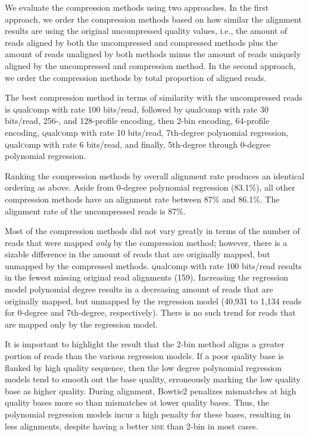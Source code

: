 \documentclass{bioinfo}
\begin{document}
We evaluate the compression methods using two approaches. In the first
approach, we order the compression methods based on how similar the
alignment results are using the original uncompressed quality values,
i.e., the amount of reads aligned by both the uncompressed and
compressed methods plus the amount of reads unaligned by both methods
minus the amount of reads uniquely aligned by the uncompressed and
compression method. In the second approach, we order the compression
methods by total proportion of aligned reads.

The best compression method in terms of similarity with the
uncompressed reads is \textsc{q}ual\textsc{c}omp with rate 100
bits/read, followed by \textsc{q}ual\textsc{c}omp with rate 30
bits/read, 256-, and 128-profile encoding, then 2-bin encoding,
64-profile encoding, \textsc{q}ual\textsc{c}omp with rate 10
bits/read, 7th-degree polynomial regression,
\textsc{q}ual\textsc{c}omp with rate 6 bits/read, and finally,
5th-degree through 0-degree polynomial regression.

Ranking the compression methods by overall alignment rate produces an
identical ordering as above. Aside from 0-degree polynomial regression
(83.1\%), all other compression methods have an alignment rate between
87\% and 86.1\%. The alignment rate of the uncompressed reads is 87\%.

Most of the compression methods did not vary greatly in terms of the
number of reads that were mapped \emph{only} by the compression
method; however, there is a sizable difference in the amount of reads
that are originally mapped, but unmapped by the compressed methods.
\textsc{q}ual\textsc{c}omp with rate 100 bits/read results in the
fewest missing original read alignments (159). Increasing the
regression model polynomial degree results in a decreasing amount of
reads that are originally mapped, but unmapped by the regression model
(40,931 to 1,134 reads for 0-degree and 7th-degree,
respectively). There is no such trend for reads that are mapped only
by the regression model.

It is important to highlight the result that the 2-bin method aligns a
greater portion of reads than the various regression models. If a
poor quality base is flanked by high quality sequence, then the low
degree polynomial regression models tend to smooth out the base
quality, erroneously marking the low quality base as higher quality.
During alignment, Bowtie2 penalizes mismatches at high quality bases
more so than mismatches at lower quality bases. Thus, the polynomial
regression models incur a high penalty for these bases, resulting in
less alignments, despite having a better \textsc{mse} than 2-bin in
most cases.
\end{document}
